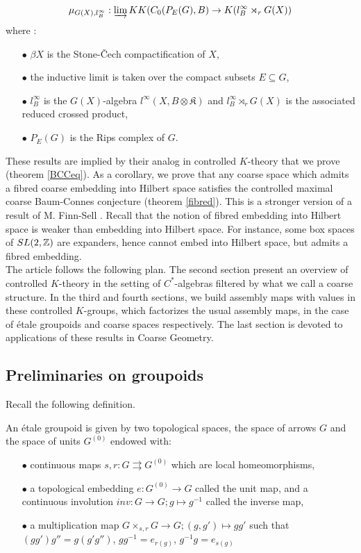 \[\mu_{G(X),l^\infty_B} : \varinjlim KK(C_0(P_E(G),B) \rightarrow K(l^\infty_B\rtimes_r G(X))\]
where :
\begin{itemize}
\item[$\bullet$] $\beta X$ is the Stone-\v{C}ech compactification of $X$,
\item[$\bullet$] the inductive limit is taken over the compact subsets $E\subseteq G$,
\item[$\bullet$] $l^\infty_B$ is the $G(X)$-algebra $l^\infty (X,B\otimes \mathfrak K)$ and $l^\infty_B\rtimes_r G(X)$ is the associated reduced crossed product,
\item[$\bullet$] $P_E(G)$ is the Rips complex of $G$.
\end{itemize}
These results are implied by their analog in controlled $K$-theory that we prove (theorem \ref{BCCeq}). As a corollary, we prove that any coarse space which admits a fibred coarse embedding into Hilbert space satisfies the controlled maximal coarse Baum-Connes conjecture (theorem \ref{fibred}). This is a stronger version of a result of M. Finn-Sell \cite{FinnSellFibred}. Recall that the notion of fibred embedding into Hilbert space is weaker than embedding into Hilbert space. For instance, some box spaces of $SL(2,\mathbb Z)$ are expanders, hence cannot embed into Hilbert space, but admits a fibred embedding.\\ 

The article follows the following plan. The second section present an overview of controlled $K$-theory in the setting of $C^*$-algebras filtered by what we call a coarse structure. In the third and fourth sections, we build assembly maps with values in these controlled $K$-groups, which factorizes the usual assembly maps, in the case of étale groupoids and coarse spaces respectively. The last section is devoted to applications of these results in Coarse Geometry.

\subsection{Preliminaries on groupoids}

Recall the following definition.

\begin{definition}
An étale groupoid is given by two topological spaces, the space of arrows $G$ and the space of units $G^{(0)}$ endowed with:
\begin{itemize}
\item[$\bullet$] continuous maps $s,r : G \rightrightarrows G^{(0)}$ which are local homeomorphisms,
\item[$\bullet$] a topological embedding $e: G^{(0)}\rightarrow G$ called the unit map, and a continuous involution $inv : G\rightarrow G; g\mapsto g^{-1}$ called the inverse map,
\item[$\bullet$] a multiplication map $G\times_{s,r}G\rightarrow G; (g,g')\mapsto gg'$ such that $(gg')g'' = g(g'g'')$, $gg^{-1}= e_{r(g)}$, $g^{-1}g= e_{s(g)}$
\end{itemize}
\end{definition}

